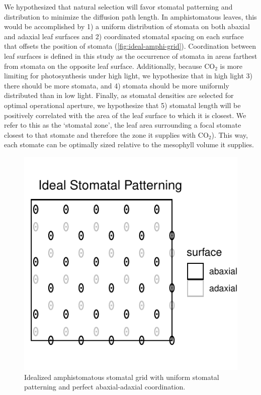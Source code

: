 \documentclass[12pt,halfline,a4paper,]{ouparticle}
\begin{document}
We hypothesized that natural selection will favor stomatal patterning
and distribution to minimize the diffusion path length. In
amphistomatous leaves, this would be accomplished by 1) a uniform
distribution of stomata on both abaxial and adaxial leaf surfaces and 2)
coordinated stomatal spacing on each surface that offsets the position
of stomata (\autoref{fig:ideal-amphi-grid}). Coordination between leaf
surfaces is defined in this study as the occurrence of stomata in areas
farthest from stomata on the opposite leaf surface. Additionally,
because CO\(_2\) is more limiting for photosynthesis under high light,
we hypothesize that in high light 3) there should be more stomata, and
4) stomata should be more uniformly distributed than in low light.
Finally, as stomatal densities are selected for optimal operational
aperture, we hypothesize that 5) stomatal length will be positively
correlated with the area of the leaf surface to which it is closest. We
refer to this as the `stomatal zone', the leaf area surrounding a focal
stomate closest to that stomate and therefore the zone it supplies with
CO\(_2\)). This way, each stomate can be optimally sized relative to the
mesophyll volume it supplies.

\begin{figure}[ht]
\includegraphics[width = \textwidth]{figures/ideal-amphi-grid.pdf}
\caption{Idealized amphistomatous stomatal grid with uniform stomatal patterning and perfect abaxial-adaxial coordination.}
\label{fig:ideal-amphi-grid}
\end{figure}
\end{document}
